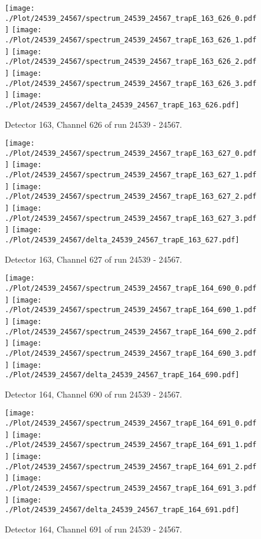 \clearpage
\begin{figure}[hb]
\centering
\texttt{[image: ./Plot/24539\_24567/spectrum\_24539\_24567\_trapE\_163\_626\_0.pdf]}
\texttt{[image: ./Plot/24539\_24567/spectrum\_24539\_24567\_trapE\_163\_626\_1.pdf]}
\texttt{[image: ./Plot/24539\_24567/spectrum\_24539\_24567\_trapE\_163\_626\_2.pdf]}
\texttt{[image: ./Plot/24539\_24567/spectrum\_24539\_24567\_trapE\_163\_626\_3.pdf]}
\texttt{[image: ./Plot/24539\_24567/delta\_24539\_24567\_trapE\_163\_626.pdf]}
\caption{ Detector 163, Channel 626 of run 24539 - 24567.}
\label{fig:24539_24567_trapE_163_626}
\end{figure}
\clearpage
\begin{figure}[hb]
\centering
\texttt{[image: ./Plot/24539\_24567/spectrum\_24539\_24567\_trapE\_163\_627\_0.pdf]}
\texttt{[image: ./Plot/24539\_24567/spectrum\_24539\_24567\_trapE\_163\_627\_1.pdf]}
\texttt{[image: ./Plot/24539\_24567/spectrum\_24539\_24567\_trapE\_163\_627\_2.pdf]}
\texttt{[image: ./Plot/24539\_24567/spectrum\_24539\_24567\_trapE\_163\_627\_3.pdf]}
\texttt{[image: ./Plot/24539\_24567/delta\_24539\_24567\_trapE\_163\_627.pdf]}
\caption{ Detector 163, Channel 627 of run 24539 - 24567.}
\label{fig:24539_24567_trapE_163_627}
\end{figure}
\clearpage
\begin{figure}[hb]
\centering
\texttt{[image: ./Plot/24539\_24567/spectrum\_24539\_24567\_trapE\_164\_690\_0.pdf]}
\texttt{[image: ./Plot/24539\_24567/spectrum\_24539\_24567\_trapE\_164\_690\_1.pdf]}
\texttt{[image: ./Plot/24539\_24567/spectrum\_24539\_24567\_trapE\_164\_690\_2.pdf]}
\texttt{[image: ./Plot/24539\_24567/spectrum\_24539\_24567\_trapE\_164\_690\_3.pdf]}
\texttt{[image: ./Plot/24539\_24567/delta\_24539\_24567\_trapE\_164\_690.pdf]}
\caption{ Detector 164, Channel 690 of run 24539 - 24567.}
\label{fig:24539_24567_trapE_164_690}
\end{figure}
\clearpage
\begin{figure}[hb]
\centering
\texttt{[image: ./Plot/24539\_24567/spectrum\_24539\_24567\_trapE\_164\_691\_0.pdf]}
\texttt{[image: ./Plot/24539\_24567/spectrum\_24539\_24567\_trapE\_164\_691\_1.pdf]}
\texttt{[image: ./Plot/24539\_24567/spectrum\_24539\_24567\_trapE\_164\_691\_2.pdf]}
\texttt{[image: ./Plot/24539\_24567/spectrum\_24539\_24567\_trapE\_164\_691\_3.pdf]}
\texttt{[image: ./Plot/24539\_24567/delta\_24539\_24567\_trapE\_164\_691.pdf]}
\caption{ Detector 164, Channel 691 of run 24539 - 24567.}
\label{fig:24539_24567_trapE_164_691}
\end{figure}
